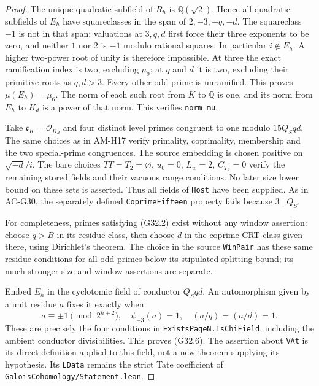 \begin{proof}
The unique quadratic subfield of $R_h$ is $\mathbb Q(\sqrt2)$.
Hence all quadratic subfields of $E_h$ have squareclasses
in the span of $2,-3,-q,-d$.  The squareclass $-1$ is
not in that span: valuations at $3,q,d$ first force their
three exponents to be zero, and neither $1$ nor $2$ is
$-1$ modulo rational squares.  In particular $i\notin E_h$.
A higher two-power root of unity is therefore impossible.
At three the exact ramification index is two, excluding
$\mu_9$; at $q$ and $d$ it is two, excluding their
primitive roots as $q,d>3$.  Every other odd prime is
unramified.  This proves $\mu(E_h)=\mu_6$.
The norm of each such root from $K$ to $\mathbb Q$ is
one, and its norm from $E_h$ to $K_d$ is a power of that
norm.  This verifies \texttt{norm\_mu}.

Take $\mathfrak c_K=\mathcal O_{K_d}$ and four distinct
level primes congruent to one modulo $15Q_Sqd$.
The same choices as in AM-H17 verify primality,
coprimality, membership and the two special-prime
congruences.  The source embedding is chosen positive
on $\sqrt{-d}/i$.  The bare choices
$TT=T_2=\varnothing$, $u_0=0$, $L_w=2$, $C_{T_2}=0$
verify the remaining stored fields and their vacuous
range conditions.  No later size lower bound on these
sets is asserted.  Thus all fields of \texttt{Host}
have been supplied.  As in AC-G30, the separately defined
\texttt{CoprimeFifteen} property fails because $3\mid Q_S$.

For completeness, primes satisfying (G32.2) exist without
any window assertion: choose $q>B$ in its residue class,
then choose $d$ in the coprime CRT class given there,
using Dirichlet's theorem.  The choice in the source
\texttt{WinPair} has these same residue conditions for
all odd primes below its stipulated splitting bound;
its much stronger size and window assertions are separate.

Embed $E_h$ in the cyclotomic field of conductor $Q_Sqd$.
An automorphism given by a unit residue $a$ fixes it
exactly when
\[
 a\equiv\pm1\pmod {2^{h+2}},\quad
 \psi_{-3}(a)=1,\quad (a/q)=(a/d)=1.
\]
These are precisely the four conditions in
\texttt{ExistsPageN.IsChiField}, including the ambient
conductor divisibilities.  This proves (G32.6).
The assertion about \texttt{VAt} is its direct definition
applied to this field, not a new theorem supplying its
hypothesis.  Its \texttt{LData} remains the strict Tate
coefficient of \texttt{GaloisCohomology/Statement.lean}.
\end{proof}

